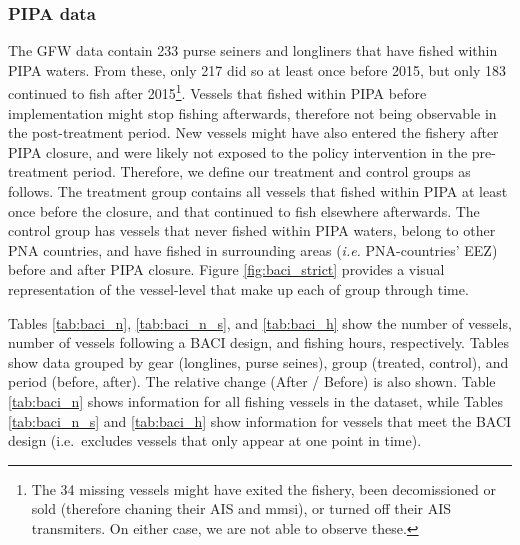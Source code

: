 \documentclass[]{article}
\let\rmarkdownfootnote\footnote%
\def\footnote{\protect\rmarkdownfootnote}
\begin{document}
\subsubsection{PIPA data}\label{pipa-data}

The GFW data contain 233 purse seiners and longliners that have fished
within PIPA waters. From these, only 217 did so at least once before
2015, but only 183 continued to fish after 2015\footnote{The 34 missing
  vessels might have exited the fishery, been decomissioned or sold
  (therefore chaning their AIS and mmsi), or turned off their AIS
  transmiters. On either case, we are not able to observe these.}.
Vessels that fished within PIPA before implementation might stop fishing
afterwards, therefore not being observable in the post-treatment period.
New vessels might have also entered the fishery after PIPA closure, and
were likely not exposed to the policy intervention in the pre-treatment
period. Therefore, we define our treatment and control groups as
follows. The treatment group contains all vessels that fished within
PIPA at least once before the closure, and that continued to fish
elsewhere afterwards. The control group has vessels that never fished
within PIPA waters, belong to other PNA countries, and have fished in
surrounding areas (\emph{i.e.} PNA-countries' EEZ) before and after PIPA
closure. Figure \ref{fig:baci_strict} provides a visual representation
of the vessel-level that make up each of group through time.

Tables \ref{tab:baci_n}, \ref{tab:baci_n_s}, and \ref{tab:baci_h} show
the number of vessels, number of vessels following a BACI design, and
fishing hours, respectively. Tables show data grouped by gear
(longlines, purse seines), group (treated, control), and period (before,
after). The relative change (After / Before) is also shown. Table
\ref{tab:baci_n} shows information for all fishing vessels in the
dataset, while Tables \ref{tab:baci_n_s} and \ref{tab:baci_h} show
information for vessels that meet the BACI design (i.e.~excludes vessels
that only appear at one point in time).
\end{document}
